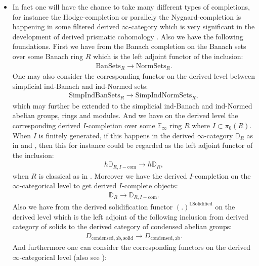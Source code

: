 \documentclass[11pt]{report}
\begin{document}
\begin{itemize}
\item \mbox{} In fact one will have the chance to take many different types of completions, for instance the Hodge-completion or parallely the Nygaard-completion is happening in some filtered derived $\infty$-category which is very significant in the development of derived prismatic cohomology \cite{BS}. Also we have the following foundations. First we have from \cite[Proposition 1.6]{BBBK} the Banach completion on the Banach sets over some Banach ring $R$ which is the left adjoint functor of the inclusion:
\begin{align}
\mathrm{BanSets}_R\rightarrow \mathrm{NormSets}_R.
\end{align}
One may also consider the corresponding functor on the derived level between simplicial ind-Banach and ind-Normed sets:
\begin{align}
\mathrm{Simp}\mathrm{Ind}\mathrm{BanSets}_R\rightarrow \mathrm{Simp}\mathrm{Ind}\mathrm{NormSets}_R,
\end{align}
which may further be extended to the simplicial ind-Banach and ind-Normed abelian groups, rings and modules. And we have on the derived level the corresponding derived $I$-completion over some $\mathbb{E}_\infty$ ring $R$ where $I\subset \pi_0(R)$. When $I$ is finitely generated, if this happens in the derived $\infty$-category $\mathbb{D}_R$ as in \cite[Chapter 1 Notation]{BS} and \cite[Chapter 3]{BS2}, then this for instance could be regarded as the left adjoint functor of the inclusion:
\begin{align}
h\mathbb{D}_{R,I-\mathrm{com}}\rightarrow h\mathbb{D}_R,
\end{align}
when $R$ is classical as in \cite[Tag 091N, Section 15.90]{SP}. Moreover we have the derived $I$-completion on the $\infty$-categorical level to get derived $I$-complete objects:
\begin{align}
\mathbb{D}_R\rightarrow  \mathbb{D}_{R,I-\mathrm{com}}. 
\end{align}
Also we have from \cite[Theorem 5.8]{CS1} the derived solidification functor $(.)^{\mathbb{L}\mathrm{Solidified}}$ on the derived level which is the left adjoint of the following inclusion from derived category of solids to the derived category of condensed abelian groups:
\begin{align}
D_{\mathrm{condensed},\mathrm{ab},\mathrm{solid}}\rightarrow D_{\mathrm{condensed},\mathrm{ab}}.
\end{align}
And furthermore one can consider the corresponding functors on the derived $\infty$-categorical level (also see \cite[Chapter 1]{Lu1}):

\end{itemize}
\end{document}
